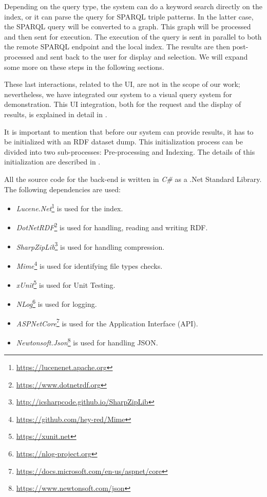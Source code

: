 Depending on the query type, the system can do a keyword search directly on the index, or it can parse the query for SPARQL triple patterns. 
In the latter case, the SPARQL query will be converted to a graph. 
This graph will be processed and then sent for execution. 
The execution of the query is sent in parallel to both the remote SPARQL endpoint and the local index. 
The results are then post-processed and sent back to the user for display and selection. 
We will expand some more on these steps in the following sections.

These last interactions, related to the UI, are not in the scope of our work; nevertheless, we have integrated our system to a visual query system for demonstration. 
This UI integration, both for the request and the display of results, is explained in detail in .

It is important to mention that before our system can provide results, it has to be initialized with an RDF dataset dump. 
This initialization process can be divided into two sub-processes: 
Pre-processing and Indexing. 
The details of this initialization are described in . 

All the source code for the back-end is written in \textit{C\#} as a .Net Standard Library. 
The following dependencies are used:

\begin{itemize}
    \item \textit{Lucene.Net}\footnote{\url{https://lucenenet.apache.org}} is used for the index. 
    \item \textit{DotNetRDF}\footnote{\url{https://www.dotnetrdf.org}} is used for handling, reading and writing RDF.
    \item \textit{SharpZipLib}\footnote{\url{http://icsharpcode.github.io/SharpZipLib}} is used for handling compression.
    \item \textit{Mime}\footnote{\url{https://github.com/hey-red/Mime}} is used for identifying file types checks.
    \item \textit{xUnit}\footnote{\url{https://xunit.net}} is used for Unit Testing.
    \item \textit{NLog}\footnote{\url{https://nlog-project.org}} is used for logging.
    \item \textit{ASPNetCore}\footnote{\url{https://docs.microsoft.com/en-us/aspnet/core}} is used for the Application Interface (API).
    \item \textit{Newtonsoft.Json}\footnote{\url{https://www.newtonsoft.com/json}} is used for handling JSON.
\end{itemize}

